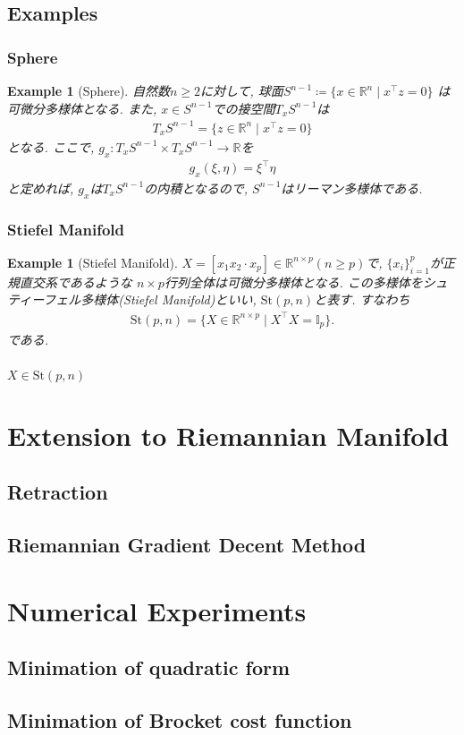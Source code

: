 \documentclass[dvipdfmx,11pt]{beamer}		%
\newtheorem{exam}[defi]{Example}
\newcommand{\R}{\mathbb{R}}
\begin{document}
    \subsection{Examples}
    \begin{frame}\frametitle{Sphere}
        \begin{exam}[Sphere]
            自然数$n\geq2$に対して, 球面$S^{n - 1}\coloneqq\{x\in\R^n\mid x^{\top}z = 0\}$
            は可微分多様体となる. また, $x\in S^{n - 1}$での接空間$T_xS^{n-1}$は
            \begin{align*}
                T_xS^{n - 1} = \{z\in\R^n\mid x^{\top}z = 0\}
            \end{align*}
            となる. ここで, $g_x : T_xS^{n - 1}\times T_xS^{n - 1}\to\R$を
            \begin{align*}
                g_x(\xi, \eta) = \xi^{\top}\eta
            \end{align*}
            と定めれば, $g_x$は$T_xS^{n-1}$の内積となるので, $S^{n - 1}$はリーマン多様体である.
        \end{exam}
    \end{frame}
    \begin{frame}\frametitle{Stiefel Manifold}
        \begin{exam}[Stiefel Manifold]
            $X = [x_1x_2\cdot x_p]\in\R^{n\times p}(n\geq p)$で, $\{x_i\}_{i = 1}^p$が正規直交系であるような
            $n\times p$行列全体は可微分多様体となる. この多様体をシュティーフェル多様体(Stiefel Manifold)といい, 
            $\mathrm{St}(p, n)$と表す. すなわち
            \begin{align*}
                \mathrm{St}(p, n) = \{X\in\R^{n\times p}\mid X^{\top}X = \mathbb{I}_{p}\}.
            \end{align*}
            である.
        \end{exam}
    \end{frame}

    \begin{frame}\frametitle{}
      $X\in\mathrm{St}(p, n)$
    \end{frame}

    
   
    \section{Extension to Riemannian Manifold}
    \subsection{Retraction}
    \subsection{Riemannian Gradient Decent Method}
    \section{Numerical Experiments}
    \subsection{Minimation of quadratic form}
    \subsection{Minimation of Brocket cost function}
\end{document}

